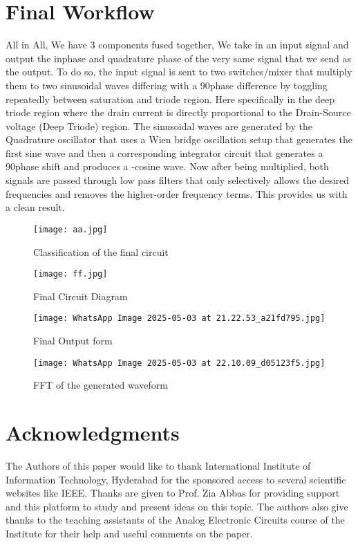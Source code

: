 \documentclass[conference]{IEEEtran}
\begin{document}
\section{Final Workflow}
All in All, We have 3 components fused together,
We take in an input signal and output the inphase and quadrature phase of the very same signal that we send as the output. To do so, the input signal is sent to two switches/mixer that multiply them to two sinusoidal waves differing with a 90\textdegree  phase difference by toggling repeatedly between saturation and triode region. Here specifically in the deep triode region where the drain current is directly proportional to the Drain-Source voltage (Deep Triode) region. The sinusoidal waves are generated by the Quadrature oscillator that uses a Wien bridge oscillation setup that generates the first sine wave and then a corresponding integrator circuit that generates a 90\textdegree phase shift and produces a -cosine wave. Now after being multiplied, both signals are passed through low pass filters that only selectively allows the desired frequencies and removes the higher-order frequency terms. This provides us with a clean result.
\begin{figure}[H]
    \centering
    \texttt{[image: aa.jpg]}
    \caption{Classification of the final circuit}
    \label{fig:enter-label}
\end{figure}
\begin{figure}[H]
    \centering
    \texttt{[image: ff.jpg]}
    \caption{Final Circuit Diagram}
    \label{fig:enter-label}
\end{figure}
\begin{figure}[H]
    \centering
    \texttt{[image: WhatsApp Image 2025-05-03 at 21.22.53\_a21fd795.jpg]}
    \caption{Final Output form}
    \label{fig:enter-label}
\end{figure}
\begin{figure}[H]
    \centering
    \texttt{[image: WhatsApp Image 2025-05-03 at 22.10.09\_d05123f5.jpg]}
    \caption{FFT of the generated waveform}
    \label{fig:enter-label}
\end{figure}
\section{Acknowledgments}

The Authors of this paper would like to thank International 
Institute of Information Technology, Hyderabad for the 
sponsored access to several scientific websites like IEEE. 
Thanks are given to Prof. Zia Abbas for providing 
support and this platform to study and present ideas on this 
topic. The authors also give thanks to the teaching assistants of the Analog Electronic Circuits course of the Institute for their help and useful comments on the paper. 
\end{document}
